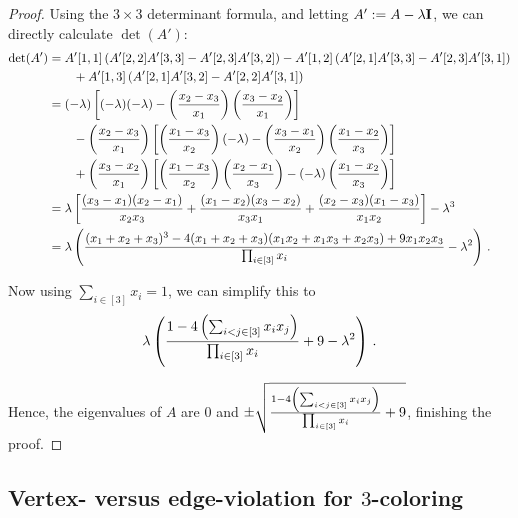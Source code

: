 
\begin{proof}
    Using the $3\times 3$ determinant formula, and letting $A':=A-\lambda \mathbf{I}$, we can directly calculate $\det(A')$:
    \begin{align*}
        \det(A')&=A'[1, 1]\left(A'[2, 2]A'[3, 3]-A'[2, 3]A'[3, 2]\right)-A'[1, 2]\left(A'[2, 1]A'[3, 3]-A'[2, 3]A'[3, 1]\right)\\&\qquad+A'[1, 3]\left(A'[2, 1]A'[3, 2]-A'[2, 2]A'[3, 1]\right)\\
        &=(-\lambda)\left[(-\lambda)(-\lambda)
        -\left(\frac{x_2 - x_3}{x_1}\right)\left(\frac{x_3 - x_2}{x_1}\right)\right] \\
        &\qquad -\left(\frac{x_2 - x_3}{x_1}\right)\left[\left(\frac{x_1 - x_3}{x_2}\right)(-\lambda)
        -\left(\frac{x_3 - x_1}{x_2}\right)\left(\frac{x_1 - x_2}{x_3}\right)\right] \\
        &\qquad +\left(\frac{x_3 - x_2}{x_1}\right)\left[\left(\frac{x_1 - x_3}{x_2}\right)\left(\frac{x_2 - x_1}{x_3}\right)
        -(-\lambda)\left(\frac{x_1 - x_2}{x_3}\right)\right]\\
        &= \lambda\left[\frac{(x_3-x_1)(x_2-x_1)}{x_2x_3}+\frac{(x_1-x_2)(x_3-x_2)}{x_3x_1}+\frac{(x_2-x_3)(x_1-x_3)}{x_1x_2}\right]-\lambda^3\\
        &=\lambda\left(\frac{(x_1+x_2+x_3)^3 - 4(x_1+x_2+x_3)(x_1x_2+x_1x_3+x_2x_3) + 9x_1x_2x_3}{\prod_{i\in[3]}x_i}-\lambda^2\right)\,.
    \end{align*}

    Now using $\sum_{i\in[3]}x_i=1$, we can simplify this to $$\lambda\left(\frac{1 - 4\left(\sum_{i<j\in[3]}x_i x_j\right)}{\prod_{i\in[3]}x_i}+9-\lambda^2\right)\,.$$

    Hence, the eigenvalues of $A$ are $0$ and $\pm \sqrt{\frac{1-4\left(\sum_{i<j\in[3]}x_i x_j\right)}{\prod_{i\in[3]}x_i}+9}$, finishing the proof.
\end{proof}

\subsection{Vertex- versus edge-violation for $3$-coloring}

